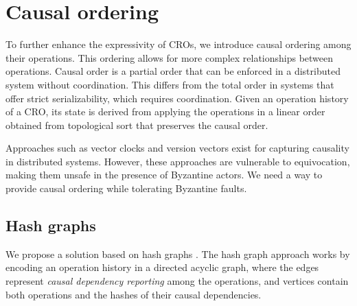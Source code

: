 \documentclass{article}
\begin{document}
\section{Causal ordering}
\label{sec:headings}

To further enhance the expressivity of CROs, we introduce causal ordering among their operations. This ordering allows for more complex relationships between operations. Causal order is a partial order that can be enforced in a distributed system without coordination. This differs from the total order in systems that offer strict serializability, which requires coordination. Given an operation history of a CRO, its state is derived from applying the operations in a linear order obtained from topological sort that preserves the causal order.

Approaches such as vector clocks and version vectors exist for capturing causality in distributed systems. However, these approaches are vulnerable to equivocation, making them unsafe in the presence of Byzantine actors. We need a way to provide causal ordering while tolerating Byzantine faults.

\subsection{Hash graphs}

We propose a solution based on hash graphs \cite{BEC, BFT-CRDT, Merkle-CRDTs, Blocklace}. The hash graph approach works by encoding an operation history in a directed acyclic graph, where the edges represent \textit{causal dependency reporting} among the operations, and vertices contain both operations and the hashes of their causal dependencies.
\end{document}
